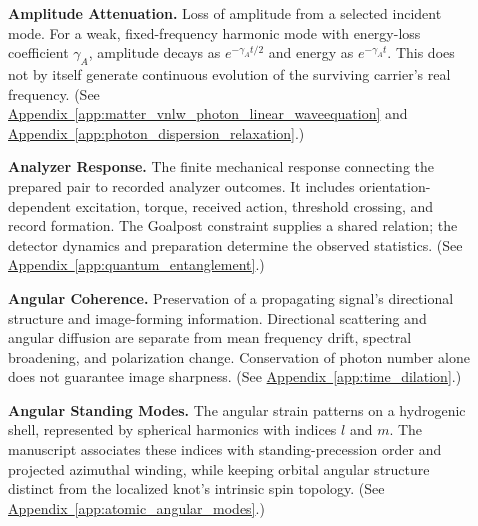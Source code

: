 \begin{description}
\item[] \begin{minipage}[t]{\linewidth}
\textbf{Amplitude Attenuation.} Loss of amplitude from a selected incident mode. For a weak, fixed-frequency harmonic mode with energy-loss coefficient $\gamma_A$, amplitude decays as $e^{-\gamma_A t/2}$ and energy as $e^{-\gamma_A t}$. This does not by itself generate continuous evolution of the surviving carrier's real frequency.
(See \hyperref[app:matter_vnlw_photon_linear_waveequation]{Appendix~\ref*{app:matter_vnlw_photon_linear_waveequation}} and \hyperref[app:photon_dispersion_relaxation]{Appendix~\ref*{app:photon_dispersion_relaxation}}.)
\end{minipage}

\item[] \begin{minipage}[t]{\linewidth}
\textbf{Analyzer Response.} The finite mechanical response connecting the prepared pair to recorded analyzer outcomes. It includes orientation-dependent excitation, torque, received action, threshold crossing, and record formation. The Goalpost constraint supplies a shared relation; the detector dynamics and preparation determine the observed statistics.
(See \hyperref[app:quantum_entanglement]{Appendix~\ref*{app:quantum_entanglement}}.)
\end{minipage}

\item[] \begin{minipage}[t]{\linewidth}
\textbf{Angular Coherence.} Preservation of a propagating signal's directional structure and image-forming information. Directional scattering and angular diffusion are separate from mean frequency drift, spectral broadening, and polarization change. Conservation of photon number alone does not guarantee image sharpness.
(See \hyperref[app:time_dilation]{Appendix~\ref*{app:time_dilation}}.)
\end{minipage}

\item[] \begin{minipage}[t]{\linewidth}
\textbf{Angular Standing Modes.} The angular strain patterns on a hydrogenic shell, represented by spherical harmonics with indices $l$ and $m$. The manuscript associates these indices with standing-precession order and projected azimuthal winding, while keeping orbital angular structure distinct from the localized knot's intrinsic spin topology.
(See \hyperref[app:atomic_angular_modes]{Appendix~\ref*{app:atomic_angular_modes}}.)
\end{minipage}


\end{description}
